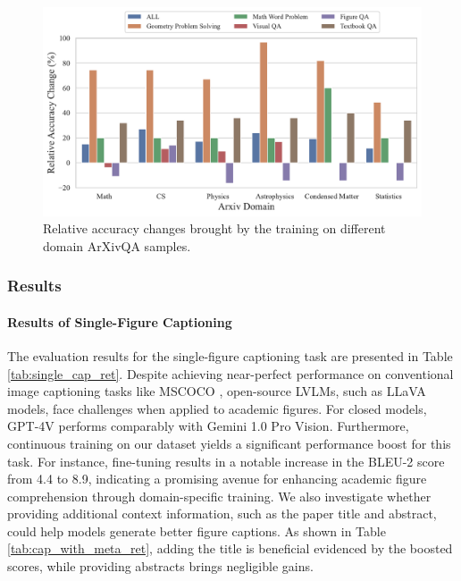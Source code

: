 \begin{figure}[t!]
    \centering
    \includegraphics[width=\linewidth]{figs/domain_performance.pdf}
    \caption{Relative accuracy changes brought by the training on different domain ArXivQA samples.}
    \label{fig:domain_analysis}
\end{figure}



\subsubsection{Results}
\paragraph{Results of Single-Figure Captioning}
The evaluation results for the single-figure captioning task are presented in Table \ref{tab:single_cap_ret}. Despite achieving near-perfect performance on conventional image captioning tasks like MSCOCO \citep{lin2014mscoco}, open-source LVLMs, such as LLaVA models, face challenges when applied to academic figures. 
For closed models, GPT-4V performs comparably with Gemini 1.0 Pro Vision.
Furthermore, continuous training on our dataset yields a significant performance boost for this task. For instance, fine-tuning results in a notable increase in the BLEU-2 score from 4.4 to 8.9, indicating a promising avenue for enhancing academic figure comprehension through domain-specific training.
We also investigate whether providing additional context information, such as the paper title and abstract, could help models generate better figure captions. As shown in Table \ref{tab:cap_with_meta_ret}, adding the title is beneficial evidenced by the boosted scores, while providing abstracts brings negligible gains.

